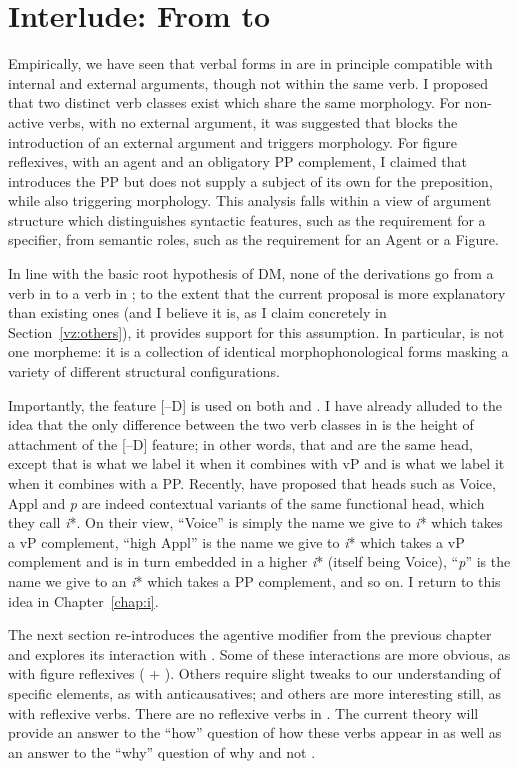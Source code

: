 \section{Interlude: From {\tnif} to {\thit}} \label{vz:interim}
Empirically, we have seen that verbal forms in {\tnif} are in principle compatible with internal and external arguments, though not within the same verb. I proposed that two distinct verb classes exist which share the same morphology. For non-active verbs, with no external argument, it was suggested that {\vz} blocks the introduction of an external argument and triggers {\tnif} morphology. For figure reflexives, with an agent and an obligatory PP complement, I claimed that {\pz} introduces the PP but does not supply a subject of its own for the preposition, while also triggering {\tnif} morphology. This analysis falls within a view of argument structure which distinguishes syntactic features, such as the requirement for a specifier, from semantic roles, such as the requirement for an Agent or a Figure.

In line with the basic root hypothesis of DM, none of the derivations go from a verb in {\tkal} to a verb in {\tnif}; to the extent that the current proposal is more explanatory than existing ones (and I believe it is, as I claim concretely in Section~\ref{vz:others}), it provides support for this assumption. In particular, {\tnif} is not one morpheme: it is a collection of identical morphophonological forms masking a variety of different structural configurations.

Importantly, the feature [--D] is used on both {\vz} and {\pz}. I have already alluded to the idea that the only difference between the two verb classes in {\tnif} is the height of attachment of the [--D] feature; in other words, that {\vz} and {\pz} are the same head, except that {\vz} is what we label it when it combines with vP and {\pz} is what we label it when it combines with a PP. Recently, \cite{woodmarantz17} have proposed that heads such as Voice, Appl and \emph{p} are indeed contextual variants of the same functional head, which they call \emph{i}*. On their view, ``Voice'' is simply the name we give to \emph{i}* which takes a vP complement, ``high Appl'' is the name we give to \emph{i}* which takes a vP complement and is in turn embedded in a higher \emph{i}* (itself being Voice), ``\emph{p}'' is the name we give to an \emph{i}* which takes a PP complement, and so on. I return to this idea in Chapter~\ref{chap:i}.

The next section re-introduces the agentive modifier {\va} from the previous chapter and explores its interaction with {\vz}. Some of these interactions are more obvious, as with figure reflexives ({\va} + {\pz}). Others require slight tweaks to our understanding of specific elements, as with anticausatives; and others are more interesting still, as with reflexive verbs. There are no reflexive verbs in {\tnif}. The current theory will provide an answer to the ``how'' question of how these verbs appear in {\thit} as well as an answer to the ``why'' question of why {\thit} and not {\tnif}.


